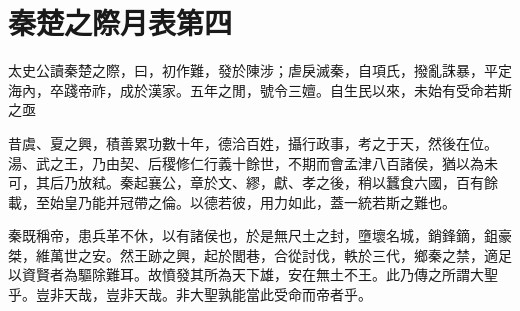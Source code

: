 \onecolumn
\chapter{秦楚之際月表第四}
			
太史公讀秦楚之際，曰，初作難，發於陳涉；虐戾滅秦，自項氏，撥亂誅暴，平定海內，卒踐帝祚，成於漢家。五年之閒，號令三嬗。自生民以來，未始有受命若斯之亟

昔虞、夏之興，積善累功數十年，德洽百姓，攝行政事，考之于天，然後在位。湯、武之王，乃由契、后稷修仁行義十餘世，不期而會孟津八百諸侯，猶以為未可，其后乃放弒。秦起襄公，章於文、繆，獻、孝之後，稍以蠶食六國，百有餘載，至始皇乃能并冠帶之倫。以德若彼，用力如此，蓋一統若斯之難也。

秦既稱帝，患兵革不休，以有諸侯也，於是無尺土之封，墮壞名城，銷鋒鏑，鉏豪桀，維萬世之安。然王跡之興，起於閭巷，合從討伐，軼於三代，鄉秦之禁，適足以資賢者為驅除難耳。故憤發其所為天下雄，安在無土不王。此乃傳之所謂大聖乎。豈非天哉，豈非天哉。非大聖孰能當此受命而帝者乎。

